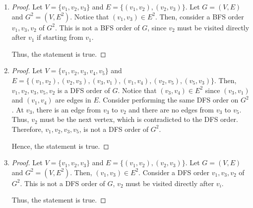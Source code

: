 \documentclass[10pt]{article}
\begin{document}
\begin{enumerate}
\begin{proof}
			By generalization, we can conclude that any BFS order of $G$ is
			a BFS order of $G^2$.


		\end{proof}

	\item
	\begin{comment}
		Prove that, for some graph $G$, there is a breadth first search order
		of $G^2$ that is not a breadth first search order of $G$
	\end{comment}

	\begin{proof}
		Let $V = \{v_1, v_2, v_3\}$ and $E = \{(v_1, v_2), (v_2, v_3)\}$.
		Let $G=(V,E)$ and $G^2 = (V, E^2)$.
		Notice that $(v_1, v_3) \in E^2$.
		Then, consider a BFS order $v_1, v_3, v_2$ of $G^2$.
		This is not a BFS order of $G$, since $v_2$ must be visited directly
		after $v_1$ if starting from $v_1$.

		Thus, the statement is true.
	\end{proof}

	\item
	\begin{comment}
		Prove that, for some graph $G$, there is a depth first search order of
		$G$ that is not a depth first search order of $G^2$
	\end{comment}
	\begin{proof}
		Let $V = \{v_1, v_2, v_3, v_4, v_5\}$ and $E = \{(v_1, v_2), (v_2,
		v_3), (v_3, v_1), (v_1, v_4), (v_2, v_5), (v_5, v_3)\}$.
		Then, $v_1, v_2, v_3, v_5, v_2$ is a DFS order of $G$.
		Notice that $(v_3, v_4) \in E^2$ since $(v_3, v_1)$ and $(v_1, v_4)$
		are edges in $E$.
		Consider performing the same DFS order on $G^2$.
		At $v_3$, there is an edge from $v_3$ to $v_2$ and there are no edges
		from $v_3$ to $v_5$.
		Thus, $v_2$ must be the next vertex, which is contradicted to the DFS
		order.
		Therefore, $v_1, v_2, v_3, v_5$, is not a DFS order of $G^2$.

		Hence, the statement is true.
	\end{proof}

	\item
	\begin{comment}
		Prove that, for some graph $G$, there is a depth frist search order of
		$G^2$ that is not a depth first search order of $G$
	\end{comment}
	\begin{proof}
		Let $V = \{v_1, v_2, v_3\}$ and $E = \{(v_1, v_2), (v_2, v_3)\}$.
		Let $G=(V,E)$ and $G^2 = (V, E^2)$.
		Then, $(v_1, v_3) \in E^2$.
		Consider a DFS order $v_1, v_3, v_2$ of $G^2$.
		This is not a DFS order of $G$, $v_2$ must be visited directly after $v_i$.

		Thus, the statement is true.
	\end{proof}

\end{enumerate}
\end{document}
